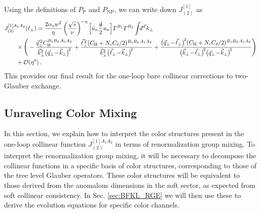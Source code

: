 \documentclass[letterpaper,11pt]{article}
\newcommand{\cO}{\mathcal{O}}
\newcommand{\nn}{\nonumber}
\newcommand\prp[1]{\vec #1_\perp}
\newcommand\prpsq[1]{\vec{#1}^{2}_\perp}
\newcommand\prpsqm[2]{\bigl( \prp{#1} \!-\! \prp{#2} \bigr)^{\!2}}
\def\bnslash{\bar n\!\!\!\slash}
\newcommand{\dbar}{d\hspace*{-0.08em}\bar{}\hspace*{0.1em}}
\begin{document}
Using the definitions of $P_{\text{P}}$ and $P_{\text{NP}}$, we can write down $J_{(2)}^{[1]}$ as
\begin{align}\label{eq:J1bare}
  &J_{(2)}^{[1]A_1 A_2}(\ell_\perp)= \frac{2 \alpha_s w^2}{\eta} \left(\frac{\sqrt{s}}{\nu} \right)^{-\eta}
 \Big[ \bar u_n  \frac{\bnslash}{2} u_n \Big] T^{B_1} T^{B_2}
  \int\!\!\dbar^{d'}\!k_\perp \nn \\
  & 
  \qquad\times
  \Bigg(  - \frac{ \vec q_\perp^{\,2}C_{\rm H}^{B_1B_2\,A_1A_2}}{\prpsq{k} \prpsqm{q}{k}}
  + \frac{ \vec\ell_\perp^{\,2} (C_{\rm H}+N_c C_\delta/2)^{B_1B_2\,A_1A_2} }{\prpsq{k} \prpsqm{\ell}{k}}
  + \frac{  \prpsqm{q}{\ell} (C_{\rm H}+N_c C_\delta/2)^{B_1B_2\,A_1A_2} }{\prpsqm{k}{\ell} \prpsqm{q}{k} }\Bigg)
  \nn \\
  &
  \qquad+\cO(\eta^0)\,.
\end{align}
This provides our final result for the one-loop bare collinear corrections to two-Glauber exchange.

\subsection{Unraveling Color Mixing}
\label{sec:unraveling}

In this section, we explain how to interpret the color structures present in the one-loop collinear function $J_{(2)}^{[1]A_1A_2}$ in terms of renormalization group mixing. To interpret the renormalization group mixing, it will be necessary to decompose the collinear functions in a specific basis of color structures, corresponding to those of the tree level Glauber operators. These color structures will be equivalent to those derived from the anomalous dimensions in the soft sector, as expected from soft collinear consistency. In Sec. \ref{sec:BFKL_RGE} we will then use these to derive the evolution equations for specific color channels.
\end{document}
